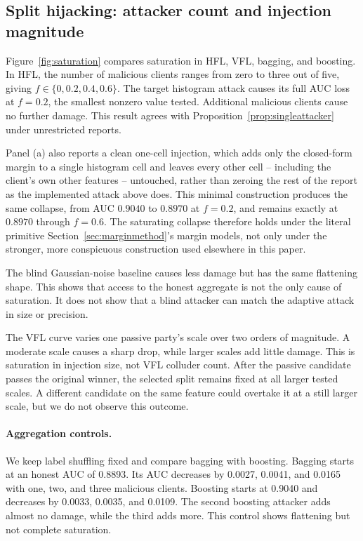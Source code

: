\documentclass[11pt]{article}
\begin{document}
\FloatBarrier

\subsection{Split hijacking: attacker count and injection magnitude}
\label{sec:saturationresults}

Figure~\ref{fig:saturation} compares saturation in HFL, VFL, bagging, and boosting. In HFL, the number of malicious clients ranges from zero to three out of five, giving $f\in\{0,0.2,0.4,0.6\}$. The target histogram attack causes its full AUC loss at $f=0.2$, the smallest nonzero value tested. Additional malicious clients cause no further damage. This result agrees with Proposition~\ref{prop:singleattacker} under unrestricted reports.

Panel (a) also reports a clean one-cell injection, which adds only the closed-form margin to a single histogram cell and leaves every other cell -- including the client's own other features -- untouched, rather than zeroing the rest of the report as the implemented attack above does. This minimal construction produces the same collapse, from AUC $0.9040$ to $0.8970$ at $f=0.2$, and remains exactly at $0.8970$ through $f=0.6$. The saturating collapse therefore holds under the literal primitive Section~\ref{sec:marginmethod}'s margin models, not only under the stronger, more conspicuous construction used elsewhere in this paper.

The blind Gaussian-noise baseline causes less damage but has the same flattening shape. This shows that access to the honest aggregate is not the only cause of saturation. It does not show that a blind attacker can match the adaptive attack in size or precision.

The VFL curve varies one passive party's scale over two orders of magnitude. A moderate scale causes a sharp drop, while larger scales add little damage. This is saturation in injection size, not VFL colluder count. After the passive candidate passes the original winner, the selected split remains fixed at all larger tested scales. A different candidate on the same feature could overtake it at a still larger scale, but we do not observe this outcome.

\paragraph{Aggregation controls.}
We keep label shuffling fixed and compare bagging with boosting. Bagging starts at an honest AUC of 0.8893. Its AUC decreases by 0.0027, 0.0041, and 0.0165 with one, two, and three malicious clients. Boosting starts at 0.9040 and decreases by 0.0033, 0.0035, and 0.0109. The second boosting attacker adds almost no damage, while the third adds more. This control shows flattening but not complete saturation.
\end{document}
